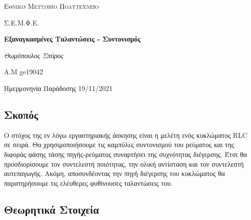\documentclass[a4paper]{article}
\begin{document}
\begin{titlepage}			%
	\centering
	{\scshape\LARGE Εθνικό Μετσόβιο Πολυτεχνείο\par}
	{\scshape \LARGE Σ.Ε.Μ.Φ.Ε.\par}
	\vspace{1cm}
	{\huge\bfseries Εξαναγκασμένες Ταλαντώσεις - Συντονισμός \par}
	\vspace{1cm}
	{\Large\itshape Θωμόπουλος Σπύρος\par}		%
	
	{\large A.M ge19042 \hfill \\}%
	\vspace{1cm}
	{\large Ημερμονηνία Παράδοσης 19/11/2021\par}
\end{titlepage}


\newpage 

\subsection*{Σκοπός}
Ο στόχος της εν λόγω εργαστηριακής άσκησης είναι η μελέτη ενός κυκλώματος RLC σε σειρά. Θα χρησιμοποιήσουμε τις καμπύλες συντονισμού του ρεύματος και της διφοράς φάσης τάσης πηγής-ρεύματος συναρτήσει της συχνότητας διέγερσης. Έτσι θα προσδιορίσουμε τον συντελεστή ποιότητας, την ολική αντίσταση και τον συντελεστή αυτεπαγωγής. Ακόμη, αποσυνδέοντας την πηγή διέγερσης του κυκλώματος θα παρατηρήσουμε τις ελέυθερες φυθίνουσες ταλαντώσεις του.

\subsection*{Θεωρητικά Στοιχεία} 
%
\end{document}
